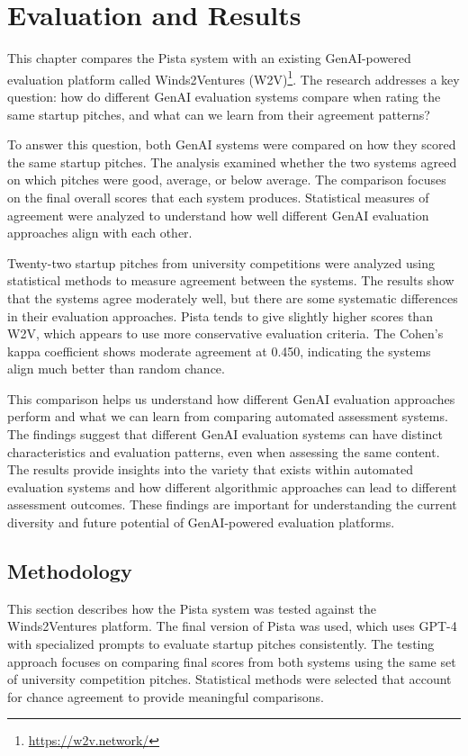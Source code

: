 \chapter{Evaluation and Results}
\label{ch:evaluation}

This chapter compares the Pista system with an existing GenAI-powered evaluation platform called Winds2Ventures (W2V)\footnote{\url{https://w2v.network/}}. The research addresses a key question: how do different GenAI evaluation systems compare when rating the same startup pitches, and what can we learn from their agreement patterns?

To answer this question, both GenAI systems were compared on how they scored the same startup pitches. The analysis examined whether the two systems agreed on which pitches were good, average, or below average. The comparison focuses on the final overall scores that each system produces. Statistical measures of agreement were analyzed to understand how well different GenAI evaluation approaches align with each other.

Twenty-two startup pitches from university competitions were analyzed using statistical methods to measure agreement between the systems. The results show that the systems agree moderately well, but there are some systematic differences in their evaluation approaches. Pista tends to give slightly higher scores than W2V, which appears to use more conservative evaluation criteria. The Cohen's kappa coefficient shows moderate agreement at 0.450, indicating the systems align much better than random chance.

This comparison helps us understand how different GenAI evaluation approaches perform and what we can learn from comparing automated assessment systems. The findings suggest that different GenAI evaluation systems can have distinct characteristics and evaluation patterns, even when assessing the same content. The results provide insights into the variety that exists within automated evaluation systems and how different algorithmic approaches can lead to different assessment outcomes. These findings are important for understanding the current diversity and future potential of GenAI-powered evaluation platforms.

\section{Methodology}
\label{sec:methodology}

This section describes how the Pista system was tested against the Winds2Ventures platform. The final version of Pista was used, which uses GPT-4 with specialized prompts to evaluate startup pitches consistently. The testing approach focuses on comparing final scores from both systems using the same set of university competition pitches. Statistical methods were selected that account for chance agreement to provide meaningful comparisons.

